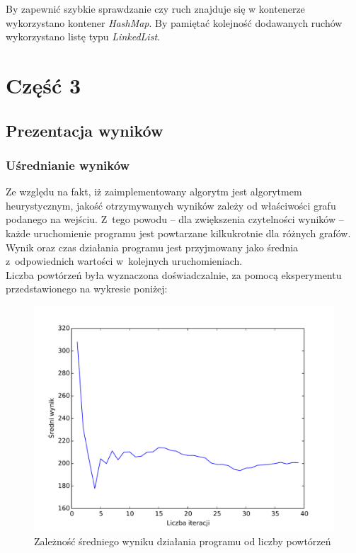 \documentclass[11pt,a4paper]{article}
\begin{document}
By zapewnić szybkie sprawdzanie czy ruch znajduje się w kontenerze wykorzystano kontener \textit{HashMap}. By pamiętać kolejność dodawanych ruchów wykorzystano listę typu \textit{LinkedList}.

\newpage
\section{Część 3}
\subsection{Prezentacja wyników}
\subsubsection{Uśrednianie wyników}
Ze względu na fakt, iż zaimplementowany algorytm jest algorytmem heurystycznym, jakość otrzymywanych wyników zależy od właściwości grafu podanego na wejściu. Z~tego powodu -- dla zwiększenia czytelności wyników -- każde uruchomienie programu jest powtarzane kilkukrotnie dla różnych grafów. Wynik oraz czas działania programu jest przyjmowany jako średnia z~odpowiednich wartości w~kolejnych uruchomieniach.\\

Liczba powtórzeń była wyznaczona doświadczalnie, za pomocą eksperymentu przedstawionego na wykresie poniżej:
\begin{figure}[H]
\includegraphics[trim = 0mm 0mm 0mm 12mm, clip, width=14cm]{graphs/repetitions.pdf}
\caption{Zależność średniego wyniku działania programu od liczby powtórzeń}
\end{figure}
\end{document}
